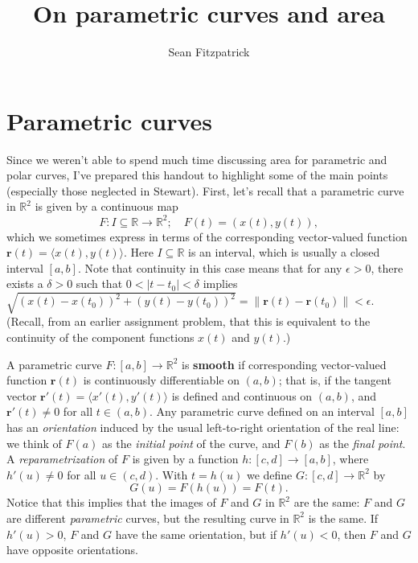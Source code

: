 \documentclass[letterpaper,12pt]{article}
\title{On parametric curves and area}
\author{Sean Fitzpatrick}
\newcommand{\abs}[1]{\lvert #1\rvert}
\newcommand{\len}[1]{\lVert #1\rVert}
\renewcommand{\r}{\mathbf{r}}
\newcommand{\R}{\mathbb{R}}
\begin{document}
\maketitle
\section{Parametric curves}
Since we weren't able to spend much time discussing area for parametric and polar curves, I've prepared this handout to highlight some of the main points (especially those neglected in Stewart). First, let's recall that a parametric curve in $\R^2$ is given by a continuous map
\[
 F:I\subseteq\R \to \R^2;\quad F(t) = (x(t),y(t)),
\]
which we sometimes express in terms of the corresponding vector-valued function $\r(t) = \langle x(t),y(t)\rangle$. Here $I\subseteq \R$ is an interval, which is usually a closed interval $[a,b]$. Note that continuity in this case means that for any $\epsilon>0$, there exists a $\delta>0$ such that $0<\abs{t-t_0}<\delta$ implies $\sqrt{(x(t)-x(t_0))^2+(y(t)-y(t_0))^2} = \len{\r(t)-\r(t_0)}<\epsilon$. (Recall, from an earlier assignment problem, that this is equivalent to the continuity of the component functions $x(t)$ and $y(t)$.) 

A parametric curve $F:[a,b]\to\R^2$ is {\bf smooth} if corresponding vector-valued function $\r(t)$ is continuously differentiable on $(a,b)$; that is, if the tangent vector $\r'(t) = \langle x'(t),y'(t)\rangle$ is defined and continuous on $(a,b)$, and $\r'(t)\neq 0$ for all $t\in (a,b)$. Any parametric curve defined on an interval $[a,b]$ has an {\em orientation} induced by the usual left-to-right orientation of the real line: we think of $F(a)$ as the {\em initial point} of the curve, and $F(b)$ as the {\em final point}. A {\em reparametrization} of $F$ is given by a function $h:[c,d]\to [a,b]$, where $h'(u)\neq 0$ for all $u\in (c,d)$. With $t=h(u)$ we define $G:[c,d]\to\R^2$ by
\[
 G(u) = F(h(u))=F(t).
\]
Notice that this implies that the images of $F$ and $G$ in $\R^2$ are the same: $F$ and $G$ are different {\em parametric} curves, but the resulting curve in $\R^2$ is the same. If $h'(u)>0$, $F$ and $G$ have the same orientation, but if $h'(u)<0$, then $F$ and $G$ have opposite orientations. 
\end{document}
